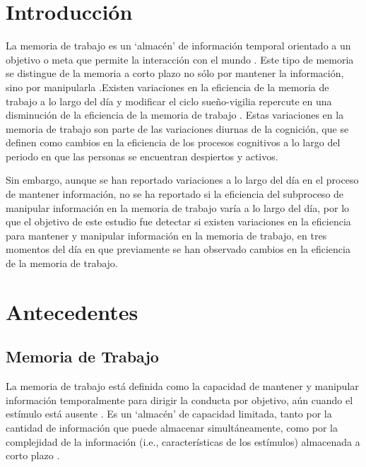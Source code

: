 \documentclass[12pt,letterpaper,final]{article}
\let\cite\cite %
\begin{document}
\section{Introducción}
La memoria de trabajo es un `almacén' de información temporal orientado a un objetivo o meta que permite la interacción con el mundo \cite{Baddeley2001}. Este tipo de memoria se distingue de la memoria a corto plazo no sólo por mantener la información, sino por manipularla \cite{Baddeley2001}.Existen variaciones en la eficiencia de la memoria de trabajo a lo largo del día y modificar el ciclo sueño-vigilia repercute en una disminución de la eficiencia de la memoria de trabajo \cite{Baddeley1970,Folkard1980,Folkard1983,Ramirez2006,Valdez2012,Valdez2014,Schmidt2015}.
Estas variaciones en la memoria de trabajo son parte de las variaciones diurnas de la cognición, que se definen como cambios en la eficiencia de los procesos cognitivos a lo largo del periodo en que las personas se encuentran despiertos y activos.

Sin embargo, aunque se han reportado variaciones a lo largo del día en el proceso de mantener información, no se ha reportado si la eficiencia del subproceso de manipular información en la memoria de trabajo varía a lo largo del día, por lo que el objetivo de este estudio fue detectar si existen variaciones en la eficiencia para mantener y manipular información en la memoria de trabajo, en tres momentos del día en que previamente se han observado cambios en la eficiencia de la memoria de trabajo.
\newpage

\section{Antecedentes}

\subsection{Memoria de Trabajo}
La memoria de trabajo está definida como la capacidad de mantener y manipular información temporalmente para dirigir la conducta por objetivo, aún cuando el estímulo está ausente \cite{Eriksson2015,Baddeley1974,Ricker2010}.
Es un `almacén' de capacidad limitada, tanto por la cantidad de información que puede almacenar simultáneamente, como por la complejidad de la información (i.e., características de los estímulos) almacenada a corto plazo \cite{Eriksson2015,Baddeley2001}.
\end{document}
